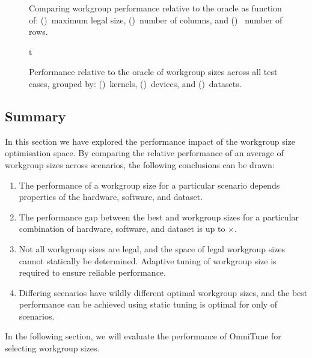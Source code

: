 \begin{figure}

\caption{%
  Comparing workgroup performance relative to the oracle as function
  of: ()~maximum legal size,
  ()~number of columns, and
  ()~ number of rows.%
}
\label{fig:performance-wgsizes}
\end{figure}
\newpage
\begin{figure}t

\caption{%
  Performance relative to the oracle of workgroup sizes across all
  test cases, grouped by: ()~kernels,
  ()~devices, and
  ()~datasets.%
}
\label{fig:performances}
\end{figure}


\subsection{Summary}

In this section we have explored the performance impact of the
workgroup size optimisation space. By comparing the relative
performance of an average of  workgroup
sizes across  scenarios, the following
conclusions can be drawn:

\begin{enumerate}
\item The performance of a workgroup size for a particular scenario
  depends properties of the hardware, software, and dataset.
\item The performance gap between the best and workgroup sizes for a
  particular combination of hardware, software, and dataset is up to
  $\times$.
\item Not all workgroup sizes are legal, and the space of legal
  workgroup sizes cannot statically be determined. Adaptive tuning of
  workgroup size is required to ensure reliable performance.
\item Differing scenarios have wildly different optimal workgroup
  sizes, and the best performance can be achieved using static tuning
  is optimal for only  of
  scenarios.
\end{enumerate}
%
%
In the following section, we will evaluate the performance of OmniTune
for selecting workgroup sizes.


